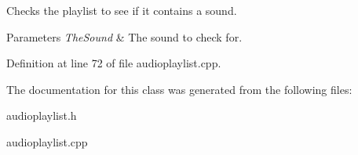 Checks the playlist to see if it contains a sound. 


\begin{DoxyParams}{Parameters}
{\em TheSound} & The sound to check for. \\
\hline
\end{DoxyParams}


Definition at line 72 of file audioplaylist.cpp.



The documentation for this class was generated from the following files:\begin{DoxyCompactItemize}
\item 
audioplaylist.h\item 
audioplaylist.cpp\end{DoxyCompactItemize}
